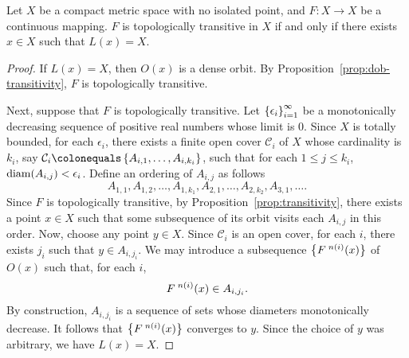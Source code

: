 \documentclass[10pt,draft,twoside]{book}
\begin{document}
\begin{proposition}
  Let $X$ be a compact metric space with no isolated point, and $F: X \to X$ be a continuous mapping.
  $F$ is topologically transitive in $X$ if and only if there exists $x \in X$ such that $L(x) = X$.
  \label{prop:martelli-wiggins1}
  \begin{proof}
    If $L(x) = X$, then $O(x)$ is a dense orbit.
    By Proposition~\ref{prop:dob-transitivity}, $F$ is topologically transitive.

    Next, suppose that $F$ is topologically transitive.
    Let $\left \{ \epsilon_i \right \}^{\infty}_{i=1}$ be a monotonically decreasing sequence of positive real numbers whose limit is 0.
    Since $X$ is totally bounded, for each $\epsilon_i$, there exists a finite open cover $\mathcal{C}_i$ of $X$ whose cardinality is $k_i$, say $\mathcal{C}_i \ceq \set{A_{i,1}, \ldots, A_{i, k_i}}$, such that for each $1 \leq j \leq k_i$, $\mathrm{diam}(A_{i,j}) < \epsilon_i$.
    Define an ordering of $A_{i,j}$ as follows
    \begin{equation*}
      A_{1,1}, A_{1,2}, \ldots, A_{1,k_1}, A_{2,1}, \ldots, A_{2,k_2}, A_{3,1}, \ldots.
    \end{equation*}
    Since $F$ is topologically transitive, by Proposition~\ref{prop:transitivity}, there exists a point $x \in X$ such that some subsequence of its orbit visits each $A_{i,j}$ in this order.
    Now, choose any point $y \in X$.
    Since $\mathcal{C}_i$ is an open cover, for each $i$, there exists $j_i$ such that $y \in A_{i,j_i}$.
    We may introduce a subsequence $\left \{ F^{\;n(i)}(x) \right \}$ of $O(x)$ such that, for each $i$, 
    \begin{equation*}
      F^{\;n(i)}(x) \in A_{i,j_i}.
    \end{equation*}
    By construction, $A_{i,j_i}$ is a sequence of sets whose diameters monotonically decrease. 
    It follows that $\left \{ F^{\;n(i)}(x) \right \}$ converges to $y$.
    Since the choice of $y$ was arbitrary, we have $L(x) = X$.
  \end{proof}
\end{proposition}
\end{document}
